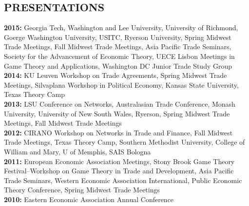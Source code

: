 \documentclass[11pt]{res}
\begin{document}
\begin{resume}
\section{PRESENTATIONS}\vspace{1.5mm}
{\bf 2015:} Georgia Tech, Washington and Lee University, University of Richmond, Goerge Washington University, USITC, Ryerson University, Spring Midwest Trade Meetings, Fall Midwest Trade Meetings, Asia Pacific Trade Seminars, Society for the Advancement of Economic Theory, UECE Lisbon Meetings in Game Theory and Applications, Washington DC Junior Trade Study Group\vspace{1.5mm}\\
{\bf 2014:} KU Leuven Workshop on Trade Agreements, Spring Midwest Trade Meetings, Silvaplana Workshop in Political Economy, Kansas State University, Texas Theory Camp\vspace{1.5mm}\\
{\bf 2013:} LSU Conference on Networks, Australasian Trade Conference, Monash University, University of New South Wales, Ryerson, Spring Midwest Trade Meetings, Fall Midwest Trade Meetings \vspace{1.5mm}\\
{\bf 2012:}  CIRANO Workshop on Networks in Trade and Finance, Fall Midwest Trade Meetings, Texas Theory Camp, Southern Methodist University, College of William and Mary, U of Memphis, SAIS Bologna\vspace{1.5mm}\\
{\bf 2011:} European Economic Association Meetings, Stony Brook Game Theory Festival--Workshop on Game Theory in Trade and Development, Asia Pacific Trade Seminars, Western Economic Association International, Public Economic Theory Conference, Spring Midwest Trade Meetings\vspace{1.5mm}\\
{\bf 2010:} Eastern Economic Association Annual Conference \vspace{1.5mm}\\



\phantom{.}\vspace{.05cm}

\end{resume}
\end{document}

